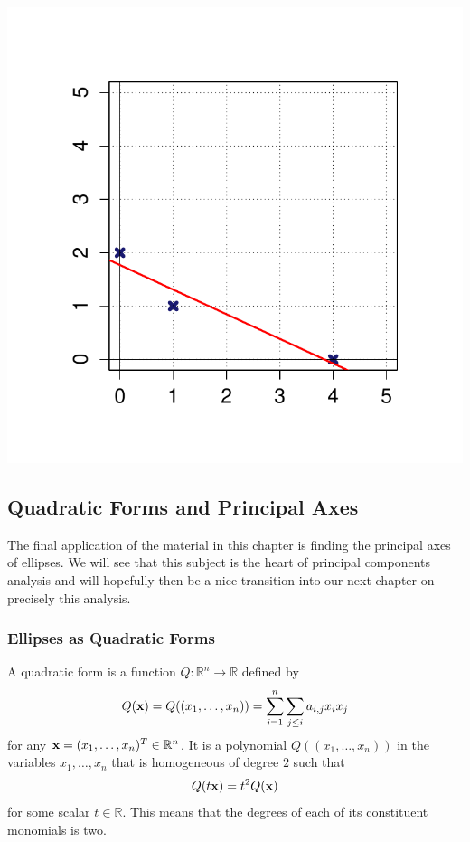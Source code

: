 \documentclass{book}
\begin{document}
{\begin{minipage}{.8\linewidth}
\centering%
\includegraphics[scale=.5]{./Figures/F14.pdf}%
\end{minipage}
}


\subsection{Quadratic Forms and Principal Axes}

The final application of the material in this chapter is finding the principal axes of ellipses. We will see that this subject is the heart of principal components analysis and will hopefully then be a nice transition into our next chapter on precisely this analysis.

\subsubsection{Ellipses as Quadratic Forms}

A quadratic form is a function $Q:\mathbb{R}^n \rightarrow \mathbb{R}$ defined by
$$
Q({\bf x})=Q((x_1,\ldots,x_n))=\sum_{i=1}^{n} \sum_{j \leq i}a_{i,j} x_ix_j
$$
for any ${\bf x}=(x_1,\ldots,x_n)^T\in\mathbb{R}^n$. It is a polynomial $Q((x_1,\ldots,x_n))$ in the variables $x_1,\ldots,x_n$ that is homogeneous of degree $2$ such that
$$
Q(t{\bf x})=t^2Q({\bf x})
$$
for some scalar $t \in \mathbb{R}$. This means that the degrees of each of its constituent monomials is two. 
\end{document}

